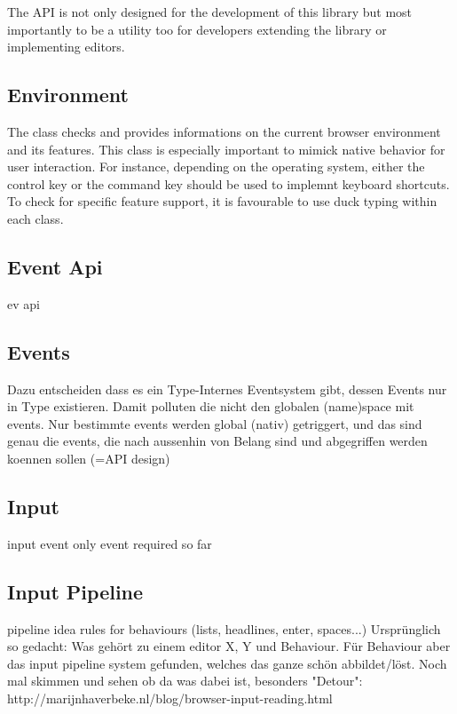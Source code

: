 \noindent The API is not only designed for the development of this library but most importantly to be a utility too for developers extending the library or implementing editors.



\subsection{Environment}

The  class checks and provides informations on the current browser environment and its features. This class is especially important to mimick native behavior for user interaction. For instance, depending on the operating system, either the control key or the command key should be used to implemnt keyboard shortcuts. To check for specific feature support, it is favourable to use duck typing within each class.

\subsection{Event Api}
ev api

\subsection{Events}

Dazu entscheiden dass es ein Type-Internes Eventsystem gibt, dessen Events nur in Type existieren. Damit polluten die nicht den globalen (name)space mit events. Nur bestimmte events werden global (nativ) getriggert, und das sind genau die events, die nach aussenhin von Belang sind und abgegriffen werden koennen sollen (=API design)

\subsection{Input}
input event only event required so far

\subsection{Input Pipeline}
pipeline idea
rules for behaviours (lists, headlines, enter, spaces...)
Ursprünglich so gedacht: Was gehört zu einem editor X, Y und Behaviour. Für Behaviour aber das input pipeline system gefunden, welches das ganze schön abbildet/löst.
Noch mal skimmen und sehen ob da was dabei ist, besonders "Detour": http://marijnhaverbeke.nl/blog/browser-input-reading.html

